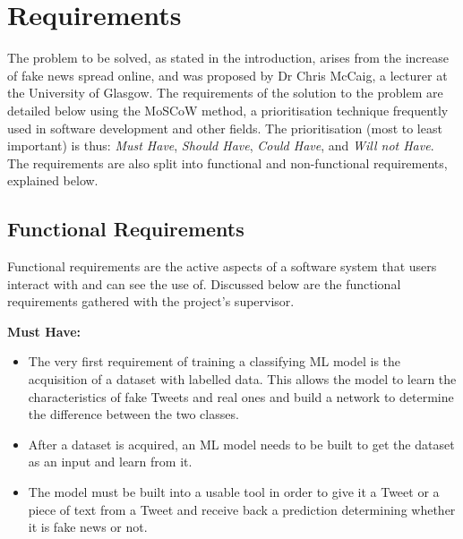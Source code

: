 \documentclass{l4proj}
\begin{document}
\chapter{Requirements}
\label{chap:anal}

The problem to be solved, as stated in the introduction, arises from the increase of fake news spread online, and was proposed by Dr Chris McCaig, a lecturer at the University of Glasgow. The requirements of the solution to the problem are detailed below using the MoSCoW method, a prioritisation technique frequently used in software development and other fields. The prioritisation (most to least important) is thus: \textit{Must Have}, \textit{Should Have}, \textit{Could Have}, and \textit{Will not Have}. The requirements are also split into functional and non-functional requirements, explained below.

\section{Functional Requirements}

Functional requirements are the active aspects of a software system that users interact with and can see the use of. Discussed below are the functional requirements gathered with the project's supervisor.

\textbf{Must Have:}
\begin{itemize}
    \item The very first requirement of training a classifying ML model is the acquisition of a dataset with labelled data. This allows the model to learn the characteristics of fake Tweets and real ones and build a network to determine the difference between the two classes.  
    \item After a dataset is acquired, an ML model needs to be built to get the dataset as an input and learn from it.
    \item The model must be built into a usable tool in order to give it a Tweet or a piece of text from a Tweet and receive back a prediction determining whether it is fake news or not.
\end{itemize}
\end{document}
